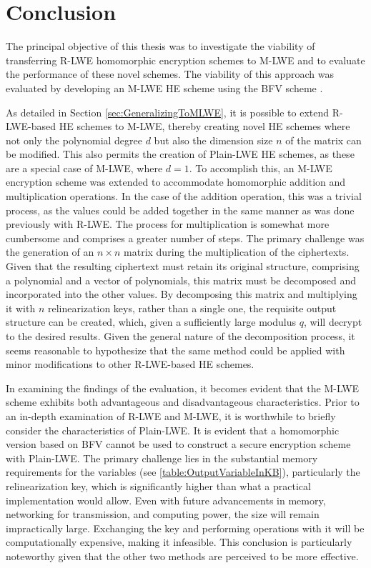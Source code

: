\chapter{Conclusion}

The principal objective of this thesis was to investigate the viability of transferring R-LWE homomorphic encryption schemes to M-LWE and to evaluate the performance of these novel schemes. The viability of this approach was evaluated by developing an M-LWE HE scheme using the BFV scheme \cite{bfv}.
 
As detailed in Section \ref{sec:GeneralizingToMLWE}, it is possible to extend R-LWE-based HE schemes to M-LWE, thereby creating novel HE schemes where not only the polynomial degree $d$ but also the dimension size $n$ of the matrix can be modified. This also permits the creation of Plain-LWE HE schemes, as these are a special case of M-LWE, where $d=1$. To accomplish this, an M-LWE encryption scheme was extended to accommodate homomorphic  addition and multiplication operations. In the case of the addition operation, this was a trivial process, as the values could be added together in the same manner as was done previously with R-LWE. The process for multiplication is somewhat more cumbersome and comprises a greater number of steps. The primary challenge was the generation of an $n \times n$ matrix during the multiplication of the ciphertexts. Given that the resulting ciphertext must retain its original structure, comprising a polynomial and a vector of polynomials, this matrix must be decomposed and incorporated into the other values. By decomposing this matrix and multiplying it with $n$ relinearization keys, rather than a single one, the requisite output structure can be created, which, given a sufficiently large modulus $q$, will decrypt to the desired results. Given the general nature of the decomposition process, it seems reasonable to hypothesize that the same method could be applied with minor modifications to other R-LWE-based HE schemes.


In examining the findings of the evaluation, it becomes evident that the M-LWE scheme exhibits both advantageous and disadvantageous characteristics. Prior to an in-depth examination of R-LWE and M-LWE, it is worthwhile to briefly consider the characteristics of Plain-LWE. It is evident that a homomorphic version based on BFV cannot be used to construct a secure encryption scheme with Plain-LWE. The primary challenge lies in the substantial memory requirements for the variables (see \ref{table:OutputVariableInKB}), particularly the relinearization key, which is significantly higher than what a practical implementation would allow. Even with future advancements in memory, networking for transmission, and computing power, the size will remain impractically large. Exchanging the key and performing operations with it will be computationally expensive, making it infeasible. This conclusion is particularly noteworthy given that the other two methods are perceived to be more effective.

